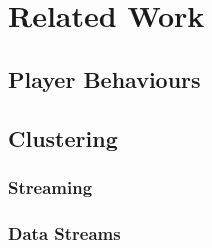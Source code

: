 
\chapter{Related Work} %
\label{Chapter3}


\section{Player Behaviours}
\section{Clustering}
\subsection{Streaming}
\subsection{Data Streams}